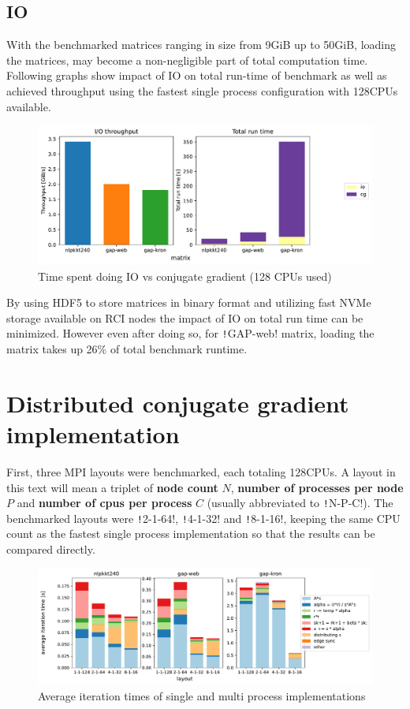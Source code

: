 \documentclass[thesis=M,english]{FITthesis}[2019/12/23]
\newcommand{\csre}[1]{\texttt!#1!}
\begin{document}
\subsection{IO}

With the benchmarked matrices ranging in size from 9GiB up to 50GiB, loading the matrices,
may become a non-negligible part of total computation time. Following graphs show impact of
IO on total run-time of benchmark as well as achieved throughput using the fastest single process
configuration with 128CPUs available.

\begin{figure}[htp]
    \centering
    \includegraphics[scale=0.6]{static/io_sp.pdf}
    \caption{Time spent doing IO vs conjugate gradient (128 CPUs used)}
\end{figure}

By using HDF5 to store matrices in binary format and utilizing fast NVMe storage available
on RCI nodes the impact of IO on total run time can be minimized. However even after doing so,
for \csre{GAP-web} matrix, loading the matrix takes up 26\% of total benchmark runtime.


\section{Distributed conjugate gradient implementation}

First, three MPI layouts were benchmarked, each totaling 128CPUs. A layout
in this text will mean a triplet of \textbf{node count} $N$,
\textbf{number of processes per node} $P$
and \textbf{number of cpus per process} $C$ (usually abbreviated to \csre{N-P-C}).
The benchmarked layouts were \csre{2-1-64}, \csre{4-1-32} and \csre{8-1-16}, keeping
the same CPU count as the fastest single process implementation so that the results
can be compared directly.

\begin{figure}[htp]
    \centering
    \includegraphics[scale=0.45]{static/mpi.pdf}
    \caption{Average iteration times of single and multi process implementations}
\end{figure}
\end{document}
